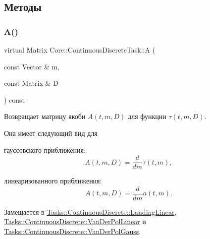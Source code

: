 \subsection{Методы}
\hypertarget{class_core_1_1_continuous_discrete_task_a332d99b61aabb919bffe75d0eec05cfe}{}\label{class_core_1_1_continuous_discrete_task_a332d99b61aabb919bffe75d0eec05cfe} 
\subsubsection{\texorpdfstring{A()}{A()}}
{\footnotesize\ttfamily virtual Matrix Core\+::\+Continuous\+Discrete\+Task\+::A (\begin{DoxyParamCaption}\item[{const Vector \&}]{m,  }\item[{const Matrix \&}]{D }\end{DoxyParamCaption}) const\hspace{0.3cm}{\ttfamily [pure virtual]}}



Возвращает матрицу якоби $A(t, m, D)$ для функции $\tau(t, m, D)$. 

Она имеет следующий вид для


\begin{DoxyItemize}
\item гауссовского приближения\+: \[A(t, m, D) = \frac{d}{dm} \tau(t, m),\]
\item линеаризованного приближения\+: \[A(t, m, D) = \frac{d}{dm} a(t, m).\] 
\end{DoxyItemize}

Замещается в \hyperlink{class_tasks_1_1_continuous_discrete_1_1_landing_linear_ae584bc7b596882f07b18d2a39dcdfa32}{Tasks\+::\+Continuous\+Discrete\+::\+Landing\+Linear}, \hyperlink{class_tasks_1_1_continuous_discrete_1_1_van_der_pol_linear_abc0ead5ddd90702a5bbb93b07c74df85}{Tasks\+::\+Continuous\+Discrete\+::\+Van\+Der\+Pol\+Linear} и \hyperlink{class_tasks_1_1_continuous_discrete_1_1_van_der_pol_gauss_acb431d1a24b276610f6b7c7ff343fb9f}{Tasks\+::\+Continuous\+Discrete\+::\+Van\+Der\+Pol\+Gauss}.

\hypertarget{class_core_1_1_continuous_discrete_task_a64ea27bc1e2a9e6bf1401fc7622c9aea}{}\label{class_core_1_1_continuous_discrete_task_a64ea27bc1e2a9e6bf1401fc7622c9aea} 
